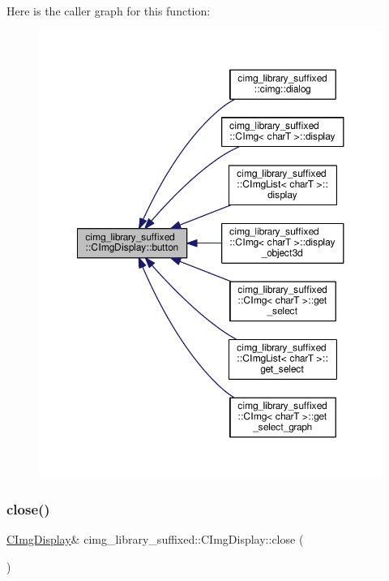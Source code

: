Here is the caller graph for this function\+:
\nopagebreak
\begin{figure}[H]
\begin{center}
\leavevmode
\includegraphics[width=350pt]{d5/d53/structcimg__library__suffixed_1_1CImgDisplay_a78f937ad8000675d0293a8d7e20627fa_icgraph}
\end{center}
\end{figure}
\mbox{\label{structcimg__library__suffixed_1_1CImgDisplay_ab8b103966af1d6ba45a410d1814e4000}} 
\subsubsection{\texorpdfstring{close()}{close()}}
{\footnotesize\ttfamily \hyperlink{structcimg__library__suffixed_1_1CImgDisplay}{C\+Img\+Display}\& cimg\+\_\+library\+\_\+suffixed\+::\+C\+Img\+Display\+::close (\begin{DoxyParamCaption}{ }\end{DoxyParamCaption})\hspace{0.3cm}{\ttfamily [inline]}}



